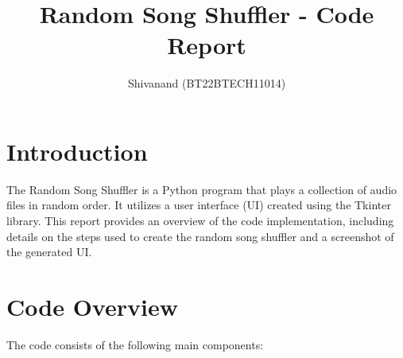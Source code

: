 \documentclass{article}
\title{Random Song Shuffler - Code Report}
\author{Shivanand
(BT22BTECH11014)}
\begin{document}
\maketitle

\section{Introduction}
The Random Song Shuffler is a Python program that plays a collection of audio files in random order. It utilizes a user interface (UI) created using the Tkinter library. This report provides an overview of the code implementation, including details on the steps used to create the random song shuffler and a screenshot of the generated UI.

\section{Code Overview}
The code consists of the following main components:
\end{document}
